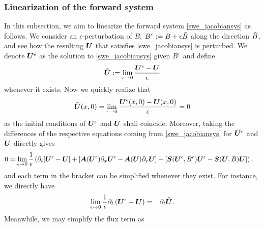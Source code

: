 \subsubsection{Linearization of the forward system}
In this subsection, we aim to linearize the forward system \eqref{swe_jacobiansys} as follows.
We consider an $\epsilon$-perturbation of $B$, $B^{\varepsilon}:= B + \epsilon{\tilde{B}}$ along the direction ${\tilde{B}}$, and see how the resulting
$\bm{U}$ that satisfies \eqref{swe_jacobiansys} is perturbed. We denote $\bm{U}^{\epsilon}$ as the solution to \eqref{swe_jacobiansys} given $B^{\varepsilon}$ and define
\begin{eqnarray}\label{u_tilde}
 \bm{\tilde{U}} := \lim_{\epsilon \rightarrow 0} \frac{\bm{U}^{\epsilon} - \bm{U}}{\epsilon} 
 \end{eqnarray}
whenever it exists.
Now we quickly realize that
\begin{equation} \label{pert_ics}
\bm{\tilde{U}}(x,0) = \lim_{\epsilon \rightarrow 0} \frac{\bm{U}^{\epsilon}(x,0) - \bm{U}(x,0)}{\epsilon}  = 0
\end{equation}
as the initial conditions of $\bm{U}^{\epsilon}$ and $ \bm{U}$ shall coincide.
Moreover, taking the differences of the respective equations coming from \eqref{swe_jacobiansys} for $\bm{U}^{\epsilon}$ and $ \bm{U}$ directly gives
\begin{equation} \label{linear_eq1}
    \begin{split}
        0 & = \lim_{\epsilon \rightarrow 0} \frac{1}{\epsilon}\left(\partial_t [ \bm{U}^{\epsilon} - \bm{U} ] + \left[ \bm{A}(\bm{U}^{\epsilon})\partial_x\bm{U}^{\epsilon} - \bm{A}(\bm{U})\partial_x\bm{U}\right] - \left[\bm{S}(\bm{U}^{\epsilon},B^\epsilon) \bm{U}^{\epsilon}- \bm{S}(\bm{U}, B)\bm{U}\right]\right), 
    \end{split}
\end{equation}
and each term in the bracket can be simplified whenever they exist.  For instance, we directly have
\begin{eqnarray} 
     \lim_{\epsilon \rightarrow 0} \frac{1}{\epsilon}\partial_t \left( \bm{U}^{\epsilon} - \bm{U} \right) & = & \partial_t \bm{\tilde{U}}. \label{linear_eq11}
\end{eqnarray}
Meanwhile, we may simplify the flux term as

